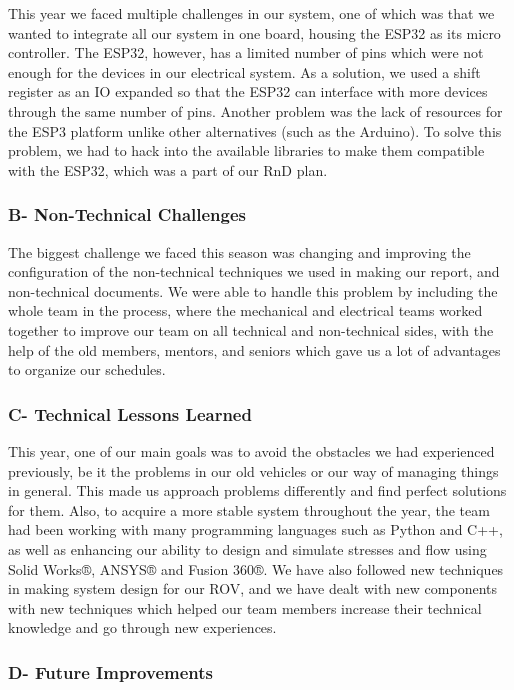 \documentclass[a4paper,12pt,leqno]{report}
\begin{document}
This year we faced multiple challenges in our system, one of which was that we wanted to  integrate all our system in one board, housing the ESP32 as its micro controller. The ESP32,  however, has a limited number of pins which were not enough for the devices in our electrical  system. As a solution, we used a shift register as an IO expanded so that the ESP32 can interface  with more devices through the same number of pins. Another problem was the lack of resources for the ESP3 platform unlike other alternatives (such as the Arduino). To solve this problem, we had to hack into the available libraries to make them compatible with the ESP32, which was a  part of our RnD plan.\\
\textcolor{blue!40}{
	\subsubsection{B- Non-Technical Challenges}}
The biggest challenge we faced this season was changing and improving the configuration of the non-technical techniques we used in making our report, and non-technical documents. We were able to handle this problem by including the whole team in the process, where the  mechanical and electrical teams worked together to improve our team on all technical and non-technical sides, with the help of the old members, mentors, and seniors which gave us a lot of  advantages to organize our schedules. \\
\textcolor{blue!40}{
\subsubsection{C- Technical Lessons Learned}}
This year, one of our main goals was to avoid the obstacles we had experienced previously, be  it the problems in our old vehicles or our way of managing things in general. This made us approach problems differently and find perfect solutions for them. Also, to acquire a more  stable system throughout the year, the team had been working with many programming  languages such as Python and C++, as well as enhancing our ability to design and simulate  stresses and flow using Solid Works®, ANSYS® and Fusion 360®. 
We have also followed new techniques in making system design for our ROV, and we have dealt  with new components with new techniques which helped our team members increase their  technical knowledge and go through new experiences. \\
\textcolor{blue!40}{
	\subsubsection{D- Future Improvements }}
\end{document}
